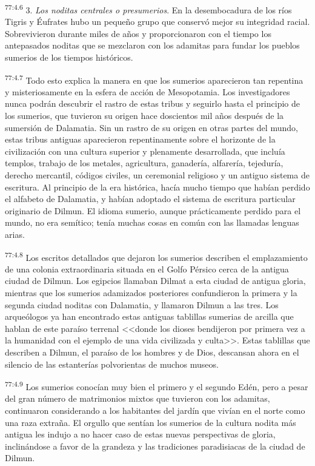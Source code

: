 \par
\textsuperscript{77:4.6} 3. \textit{Los noditas centrales o presumerios}. En la desembocadura de los ríos Tigris y Éufrates hubo un pequeño grupo que conservó mejor su integridad racial. Sobrevivieron durante miles de años y proporcionaron con el tiempo los antepasados noditas que se mezclaron con los adamitas para fundar los pueblos sumerios de los tiempos históricos.

\par
\textsuperscript{77:4.7} Todo esto explica la manera en que los sumerios aparecieron tan repentina y misteriosamente en la esfera de acción de Mesopotamia. Los investigadores nunca podrán descubrir el rastro de estas tribus y seguirlo hasta el principio de los sumerios, que tuvieron su origen hace doscientos mil años después de la sumersión de Dalamatia. Sin un rastro de su origen en otras partes del mundo, estas tribus antiguas aparecieron repentinamente sobre el horizonte de la civilización con una cultura superior y plenamente desarrollada, que incluía templos, trabajo de los metales, agricultura, ganadería, alfarería, tejeduría, derecho mercantil, códigos civiles, un ceremonial religioso y un antiguo sistema de escritura. Al principio de la era histórica, hacía mucho tiempo que habían perdido el alfabeto de Dalamatia, y habían adoptado el sistema de escritura particular originario de Dilmun. El idioma sumerio, aunque prácticamente perdido para el mundo, no era semítico; tenía muchas cosas en común con las llamadas lenguas arias.

\par
\textsuperscript{77:4.8} Los escritos detallados que dejaron los sumerios describen el emplazamiento de una colonia extraordinaria situada en el Golfo Pérsico cerca de la antigua ciudad de Dilmun. Los egipcios llamaban Dilmat a esta ciudad de antigua gloria, mientras que los sumerios adamizados posteriores confundieron la primera y la segunda ciudad noditas con Dalamatia, y llamaron Dilmun a las tres. Los arqueólogos ya han encontrado estas antiguas tablillas sumerias de arcilla que hablan de este paraíso terrenal <<donde los dioses bendijeron por primera vez a la humanidad con el ejemplo de una vida civilizada y culta>>. Estas tablillas que describen a Dilmun, el paraíso de los hombres y de Dios, descansan ahora en el silencio de las estanterías polvorientas de muchos museos.

\par
\textsuperscript{77:4.9} Los sumerios conocían muy bien el primero y el segundo Edén, pero a pesar del gran número de matrimonios mixtos que tuvieron con los adamitas, continuaron considerando a los habitantes del jardín que vivían en el norte como una raza extraña. El orgullo que sentían los sumerios de la cultura nodita más antigua les indujo a no hacer caso de estas nuevas perspectivas de gloria, inclinándose a favor de la grandeza y las tradiciones paradisiacas de la ciudad de Dilmun.

